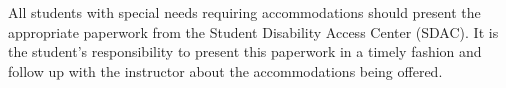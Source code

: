 \documentclass[oneside,11pt]{amsart}
\begin{document}
All students with special needs requiring accommodations should present the appropriate paperwork from the Student Disability Access Center (SDAC). It is the student's responsibility to present this paperwork in a timely fashion and follow up with the instructor about the accommodations being offered. 

%
\end{document}
